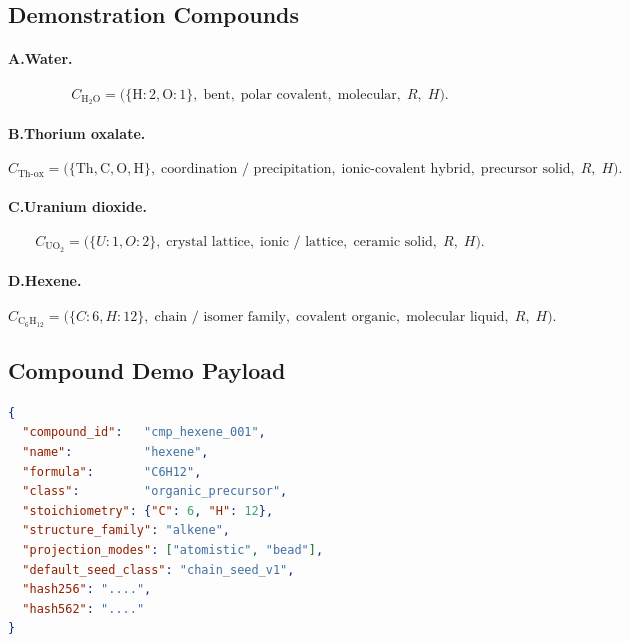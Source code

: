 \documentclass[11pt, a4paper, oneside]{article}
\begin{document}
\subsection{Demonstration Compounds}

\paragraph{A.\;Water.}
\[
C_{\text{H}_2\text{O}} =
  \bigl(\{\text{H}{:}2,\text{O}{:}1\},\;\text{bent},\;\text{polar covalent},\;
        \text{molecular},\;R,\;H\bigr).
\]

\paragraph{B.\;Thorium oxalate.}
\[
C_{\text{Th-ox}} =
  \bigl(\{\text{Th},\text{C},\text{O},\text{H}\},\;\text{coordination / precipitation},\;
        \text{ionic-covalent hybrid},\;\text{precursor solid},\;R,\;H\bigr).
\]

\paragraph{C.\;Uranium dioxide.}
\[
C_{\text{UO}_2} =
  \bigl(\{U{:}1,O{:}2\},\;\text{crystal lattice},\;\text{ionic / lattice},\;
        \text{ceramic solid},\;R,\;H\bigr).
\]

\paragraph{D.\;Hexene.}
\[
C_{\text{C}_6\text{H}_{12}} =
  \bigl(\{C{:}6,H{:}12\},\;\text{chain / isomer family},\;\text{covalent organic},\;
        \text{molecular liquid},\;R,\;H\bigr).
\]

\subsection{Compound Demo Payload}

\begin{lstlisting}[language=JSON, caption={Hexene compound registry entry}]
{
  "compound_id":   "cmp_hexene_001",
  "name":          "hexene",
  "formula":       "C6H12",
  "class":         "organic_precursor",
  "stoichiometry": {"C": 6, "H": 12},
  "structure_family": "alkene",
  "projection_modes": ["atomistic", "bead"],
  "default_seed_class": "chain_seed_v1",
  "hash256": "....",
  "hash562": "...."
}
\end{lstlisting}


\end{document}
